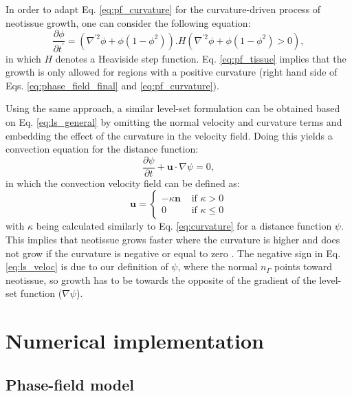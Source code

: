 In order to adapt Eq. \ref{eq:pf_curvature} for the curvature-driven process of neotissue growth, one can consider the following equation:
\begin{equation} \label{eq:pf_tissue}
\frac{\partial \phi}{\partial t^{\prime}}=\left(\nabla^{\prime 2} \phi+\phi\left(1-\phi^{2}\right)\right).H\left(\nabla^{\prime 2} \phi+\phi\left(1-\phi^{2}\right)>0\right),
\end{equation}
in which $H$ denotes a Heaviside step function. Eq. \ref{eq:pf_tissue} implies that the growth is only allowed for regions with a positive curvature (right hand side of Eqs. \ref{eq:phase_field_final} and \ref{eq:pf_curvature}).

Using the same approach, a similar level-set formulation can be obtained based on Eq. \ref{eq:ls_general} by omitting the normal velocity and curvature terms and embedding the effect of the curvature in the velocity field. Doing this yields a convection equation for the distance function:
\begin{equation} \label{eq:ls_advect}
\frac{\partial \psi}{\partial t}+\boldsymbol{u} \cdot \nabla \psi=0,
\end{equation}
in which the convection velocity field can be defined as:
\begin{equation} \label{eq:ls_veloc}
\boldsymbol{u}=\left\{\begin{array}{ll}
-\kappa \boldsymbol{n} & \text { if } \kappa>0 \\
0 & \text { if } \kappa \leq 0
\end{array}\right.
\end{equation}
with $\kappa$ being calculated similarly to Eq. \ref{eq:curvature} for a distance function $\psi$. This implies that neotissue grows faster where the curvature is higher and does not grow if the curvature is negative or equal to zero \cite{Bidan2012}. The negative sign in Eq. \ref{eq:ls_veloc} is due to our definition of $\psi$, where the normal $n_\Gamma$  points toward neotissue, so growth has to be towards the opposite of the gradient of the level-set function ($ \nabla \psi$).

\section{Numerical implementation}

\subsection{Phase-field model}

